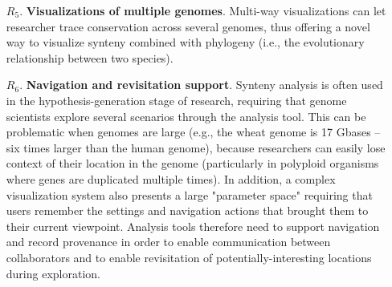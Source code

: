 \begin{enumerate}
\item [$R_5$.] \textbf{Visualizations of multiple genomes}. Multi-way visualizations can let researcher trace conservation across several genomes, thus offering a novel way to visualize synteny combined with phylogeny (i.e., the evolutionary relationship between two species).

\item [$R_6$.] \textbf{Navigation and revisitation support}. Synteny analysis is often used in the hypothesis-generation stage of research, requiring that genome scientists explore several scenarios through the analysis tool. This can be problematic when genomes are large (e.g., the wheat genome is 17 Gbases -- six times larger than the human genome), because researchers can easily lose context of their location in the genome (particularly in polyploid organisms where genes are duplicated multiple times). In addition, a complex visualization system also presents a large "parameter space" requiring that users remember the settings and navigation actions that brought them to their current viewpoint. Analysis tools therefore need to support navigation and record provenance in order to enable communication between collaborators and to enable revisitation of potentially-interesting locations during exploration.

\end{enumerate}

